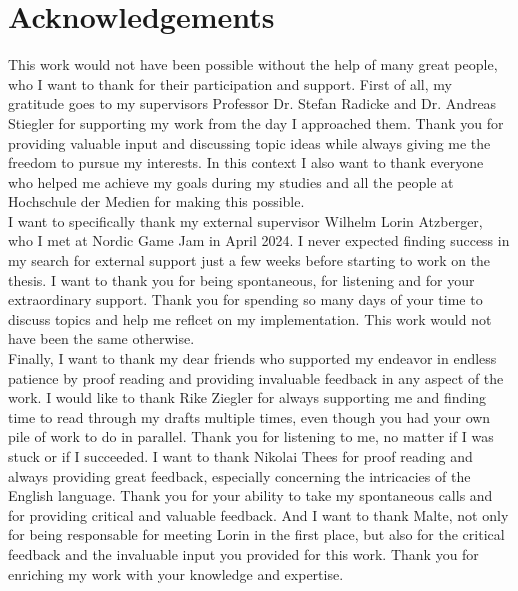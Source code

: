 \chapter{Acknowledgements}

This work would not have been possible without the help of many great people, who I want to thank for their 
participation and support. First of all, my gratitude goes to my supervisors Professor Dr. Stefan Radicke 
and Dr. Andreas Stiegler for supporting my work from the day I approached them. Thank you for providing 
valuable input and discussing topic ideas while always giving me the freedom to pursue my interests. In 
this context I also want to thank everyone who helped me achieve my goals during my studies and all the 
people at Hochschule der Medien for making this possible. \\

\noindent
I want to specifically thank my external supervisor Wilhelm Lorin Atzberger, who I met at Nordic Game Jam 
in April 2024. I never expected finding success in my search for external support just a few weeks before 
starting to work on the thesis. I want to thank you for being spontaneous, for listening and for your 
extraordinary support. Thank you for spending so many days of your time to discuss topics and help me 
reflcet on my implementation. This work would not have been the same otherwise. \\

\noindent
Finally, I want to thank my dear friends who supported my endeavor in endless patience by proof reading and 
providing invaluable feedback in any aspect of the work. I would like to thank Rike Ziegler for always 
supporting me and finding time to read through my drafts multiple times, even though you had your own 
pile of work to do in parallel. Thank you for listening to me, no matter if I was stuck or if I succeeded. 
I want to thank Nikolai Thees for proof reading and always providing great feedback, especially concerning 
the intricacies of the English language. Thank you for your ability to take my spontaneous calls and for 
providing critical and valuable feedback. And I want to thank Malte, not only for being responsable for 
meeting Lorin in the first place, but also for the critical feedback and the invaluable input you provided 
for this work. Thank you for enriching my work with your knowledge and expertise. \\

